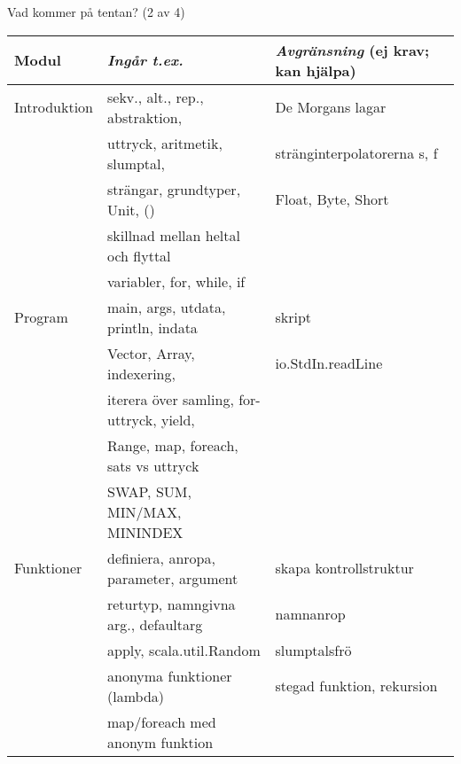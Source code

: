 \begin{Slide}{Vad kommer på tentan? (2 av 4)}\SlideFontTiny
\hspace{-1em}\begin{minipage}{1.0\textwidth}
\vspace{1em}\begin{tabular}{l | l | l}
\textbf{Modul} & \textit{Ingår t.ex.}& \textit{Avgränsning} (ej krav; kan hjälpa)\\\hline
\hline
Introduktion & sekv., alt., rep., abstraktion, & De Morgans lagar \\
             & uttryck, aritmetik, slumptal, &    stränginterpolatorerna s, f\\
             & strängar, grundtyper, Unit, ()  & Float, Byte, Short \\
             & skillnad mellan heltal och flyttal \\
             & variabler, for, while, if & \\ %
\hline
Program      & main, args, utdata, println, indata & skript\\
             & Vector, Array, indexering,  &    io.StdIn.readLine \\
             & iterera över samling, for-uttryck, yield, \\
             & Range, map, foreach, sats vs uttryck & \\
             & SWAP, SUM, MIN/MAX, MININDEX & \\
\hline
Funktioner    & definiera, anropa, parameter, argument  & skapa kontrollstruktur \\
              & returtyp, namngivna arg., defaultarg  & namnanrop\\
              & apply,  scala.util.Random & slumptalsfrö\\
              & anonyma funktioner (lambda)  & stegad funktion, rekursion\\
              & map/foreach med anonym funktion & \\

\end{tabular}
\end{minipage}
\end{Slide}


